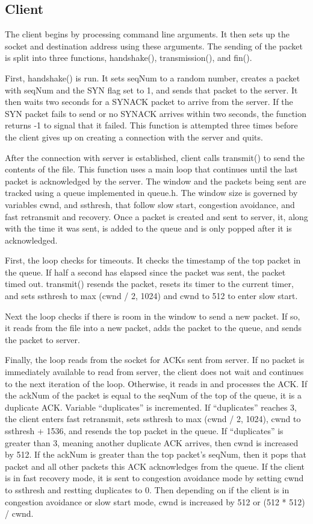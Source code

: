 \documentclass[12pt]{article}
\begin{document}
\subsection{Client}
The client begins by processing command line arguments. It then sets up the socket and destination address using these arguments. The sending of the packet is split into three functions, handshake(), transmission(), and fin().

First, handshake() is run. It sets seqNum to a random number, creates a packet with seqNum and the SYN flag set to 1, and sends that packet to the server. It then waits two seconds for a SYNACK packet to arrive from the server. If the SYN packet fails to send or no SYNACK arrives within two seconds, the function returns -1 to signal that it failed. This function is attempted three times before the client gives up on creating a connection with the server and quits.

After the connection with server is established, client calls transmit() to send the contents of the file. This function uses a main loop that continues until the last packet is acknowledged by the server. The window and the packets being sent are tracked using a queue implemented in queue.h. The window size is governed by variables cwnd, and ssthresh, that follow slow start, congestion avoidance, and fast retransmit and recovery. Once a packet is created and sent to server, it, along with the time it was sent, is added to the queue and is only popped after it is acknowledged.

First, the loop checks for timeouts. It checks the timestamp of the top packet in the queue. If half a second has elapsed since the packet was sent, the packet timed out. transmit() resends the packet, resets its timer to the current timer, and sets ssthresh to max (cwnd / 2, 1024) and cwnd to 512 to enter slow start.

Next the loop checks if there is room in the window to send a new packet. If so, it reads from the file into a new packet, adds the packet to the queue, and sends the packet to server.

Finally, the loop reads from the socket for ACKs sent from server. If no packet is immediately available to read from server, the client does not wait and continues to the next iteration of the loop. Otherwise, it reads in and processes the ACK. If the ackNum of the packet is equal to the seqNum of the top of the queue, it is a duplicate ACK. Variable ``duplicates'' is incremented. If ``duplicates'' reaches 3, the client enters fast retransmit, sets ssthresh to max (cwnd / 2, 1024), cwnd to ssthresh + 1536, and resends the top packet in the queue. If ``duplicates'' is greater than 3, meaning another duplicate ACK arrives, then cwnd is increased by 512. If the ackNum is greater than the top packet's seqNum, then it pops that packet and all other packets this ACK acknowledges from the queue. If the client is in fast recovery mode, it is sent to congestion avoidance mode by setting cwnd to ssthresh and restting duplicates to 0. Then depending on if the client is in congestion avoidance or slow start mode, cwnd is increased by 512 or (512 * 512) / cwnd.
\end{document}
